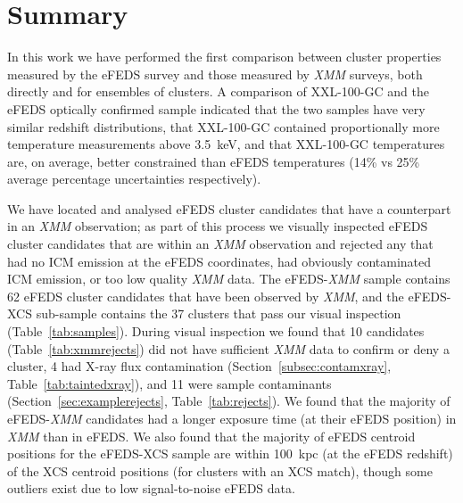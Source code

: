 \documentclass[fleqn,usenatbib]{mnras}
\begin{document}


\section{Summary}
\label{sec:summary}

In this work we have performed the first comparison between cluster properties measured by the eFEDS survey and those measured by {\em XMM} surveys, both directly and for ensembles of clusters. A comparison of XXL-100-GC and the eFEDS optically confirmed sample indicated that the two samples have very similar redshift distributions, that XXL-100-GC contained proportionally more temperature measurements above 3.5~keV, and that XXL-100-GC temperatures are, on average, better constrained than eFEDS temperatures (14\% vs 25\% average percentage uncertainties respectively).

We have located and analysed eFEDS cluster candidates that have a counterpart in an {\em XMM} observation; as part of this process we visually inspected eFEDS cluster candidates that are within an {\em XMM} observation and rejected any that had no ICM emission at the eFEDS coordinates, had obviously contaminated ICM emission, or too low quality {\em XMM} data. The eFEDS-{\em XMM} sample contains 62 eFEDS cluster candidates that have been observed by {\em XMM}, and the eFEDS-XCS sub-sample contains the 37 clusters that pass our visual inspection (Table~\ref{tab:samples}). During visual inspection we found that 10 candidates (Table~\ref{tab:xmmrejects}) did not have sufficient {\em XMM} data to confirm or deny a cluster, 4 had X-ray flux contamination (Section~\ref{subsec:contamxray}, Table~\ref{tab:taintedxray}), and 11 were sample contaminants (Section~\ref{sec:examplerejects}, Table~\ref{tab:rejects}). We found that the majority of eFEDS-{\em XMM} candidates had a longer exposure time (at their eFEDS position) in {\em XMM} than in eFEDS. We also found that the majority of eFEDS centroid positions for the eFEDS-XCS sample are within 100~kpc (at the eFEDS redshift) of the XCS centroid positions (for clusters with an XCS match), though some outliers exist due to low signal-to-noise eFEDS data.
\end{document}
